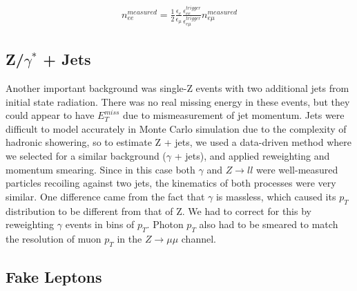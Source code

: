 \documentclass{article}
\begin{document}
\begin{gather}
n_{ee}^{measured} = \frac{1}{2}\frac{\epsilon_e}{\epsilon_{\mu}}\frac{\epsilon_{ee}^{trigger}}{\epsilon_{e\mu}^{trigger}}n_{e\mu}^{measured}
\end{gather}

\subsection*{Z/$\gamma^*$ + Jets}

Another important background was single-Z events with two additional jets from initial state radiation. There was no real missing energy in these events, but they could appear to have $E_T^{miss}$ due to mismeasurement of jet momentum. Jets were difficult to model accurately in Monte Carlo simulation due to the complexity of hadronic showering, so to estimate Z + jets, we used a data-driven method where we selected for a similar background ($\gamma$ + jets), and applied reweighting and momentum smearing. Since in this case both $\gamma$ and $Z\rightarrow ll$ were well-measured particles recoiling against two jets, the kinematics of both processes were very similar. One difference came from the fact that $\gamma$ is massless, which caused its $p_T$ distribution to be different from that of Z. We had to correct for this by reweighting $\gamma$ events in bins of $p_T$. Photon $p_T$ also had to be smeared to match the resolution of muon $p_T$ in the $Z\rightarrow\mu\mu$ channel.



\subsection*{Fake Leptons}
\end{document}
